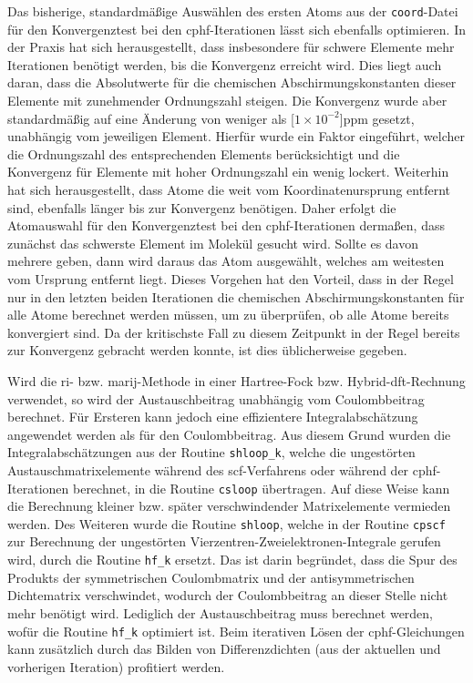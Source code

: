 \bigskip
Das bisherige, standardmäßige Auswählen des ersten Atoms aus der \texttt{coord}-Datei für den Konvergenztest bei den \ac{cphf}-Iterationen lässt sich ebenfalls optimieren. In der Praxis hat sich herausgestellt, dass insbesondere für schwere Elemente mehr Iterationen benötigt werden, bis die Konvergenz erreicht wird. Dies liegt auch daran, dass die Absolutwerte für die chemischen Abschirmungskonstanten dieser Elemente mit zunehmender Ordnungszahl steigen. Die Konvergenz wurde aber standardmäßig auf eine Änderung von weniger als \unit[$1\times 10^{-2}$]{ppm} gesetzt, unabhängig vom jeweiligen Element. Hierfür wurde ein Faktor eingeführt, welcher die Ordnungszahl des entsprechenden Elements berücksichtigt und die Konvergenz für Elemente mit hoher Ordnungszahl ein wenig lockert. Weiterhin hat sich herausgestellt, dass Atome die weit vom Koordinatenursprung entfernt sind, ebenfalls länger bis zur Konvergenz benötigen. Daher erfolgt die Atomauswahl für den Konvergenztest bei den \ac{cphf}-Iterationen dermaßen, dass zunächst das schwerste Element im Molekül gesucht wird. Sollte es davon mehrere geben, dann wird daraus das Atom ausgewählt, welches am weitesten vom Ursprung entfernt liegt. Dieses Vorgehen hat den Vorteil, dass in der Regel nur in den letzten beiden Iterationen die chemischen Abschirmungskonstanten für alle Atome berechnet werden müssen, um zu überprüfen, ob alle Atome bereits konvergiert sind. Da der kritischste Fall zu diesem Zeitpunkt in der Regel bereits zur Konvergenz gebracht werden konnte, ist dies üblicherweise gegeben.

\bigskip
Wird die \ac{ri}- bzw. \ac{marij}-Methode in einer Hartree-Fock bzw. Hybrid-\ac{dft}-Rechnung verwendet, so wird der Austauschbeitrag unabhängig vom Coulombbeitrag berechnet. Für Ersteren kann jedoch eine effizientere Integralabschätzung\supercite{ochsenfeld1998linear} angewendet werden als für den Coulombbeitrag. Aus diesem Grund wurden die Integralabschätzungen aus der Routine \texttt{shloop\_k}, welche die ungestörten Austauschmatrixelemente während des \ac{scf}-Verfahrens oder während der \ac{cphf}-Iterationen berechnet, in die Routine \texttt{csloop} übertragen. Auf diese Weise kann die Berechnung kleiner bzw. später verschwindender Matrixelemente vermieden werden. Des Weiteren wurde die Routine \texttt{shloop}, welche in der Routine \texttt{cpscf} zur Berechnung der ungestörten Vierzentren-Zweielektronen-Integrale gerufen wird, durch die Routine \texttt{hf\_k} ersetzt. Das ist darin begründet, dass die Spur des Produkts der symmetrischen Coulombmatrix und der antisymmetrischen Dichtematrix verschwindet, wodurch der Coulombbeitrag an dieser Stelle nicht mehr benötigt wird. Lediglich der Austauschbeitrag muss berechnet werden, wofür die Routine \texttt{hf\_k} optimiert ist. Beim iterativen Lösen der \ac{cphf}-Gleichungen kann zusätzlich durch das Bilden von Differenzdichten (aus der aktuellen und vorherigen Iteration) profitiert werden. 

